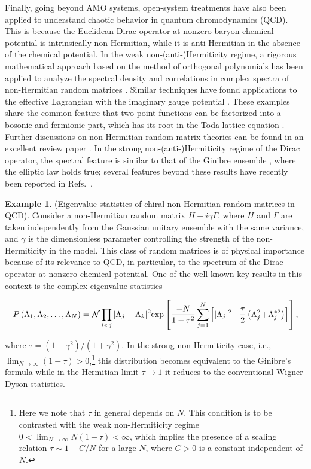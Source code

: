 \documentclass{tADP2e}
\theoremstyle{plain}
\newcommand{\eqn}[1]{
\begin{eqnarray}
	#1
\end{eqnarray}
}
\theoremstyle{plain}
\theoremstyle{definition}
\newtheorem{example}{Example}[section]
\newcommand{\exmp}[1]{
\begin{example}
	#1
\end{example}
}
\begin{document}
Finally, going beyond AMO systems, open-system treatments have also been applied to understand chaotic behavior in quantum chromodynamics (QCD). This is because the Euclidean Dirac operator at nonzero baryon chemical potential is intrinsically non-Hermitian, while it is anti-Hermitian in the absence of the chemical potential. In the weak non-(anti-)Hermiticity regime, a rigorous mathematical approach based on the method of orthogonal polynomials has been applied to analyze the spectral density and correlations in complex spectra of non-Hermitian random matrices \cite{RMTbook}. Similar techniques have found applications to the effective Lagrangian with the imaginary gauge potential \cite{EKB97,EKB972}. These examples share the common feature that two-point functions  can be factorized into a bosonic and fermionic part, which has its root in the Toda lattice equation \cite{KS04}. 
Further discussions on non-Hermitian random matrix theories can be found in an excellent review paper \cite{Fyodorov_2003}. In the strong non-(anti-)Hermiticity regime of the Dirac operator, the spectral feature is similar to that of the Ginibre ensemble \cite{JG65}, where the elliptic law holds true; several features beyond these results have recently been reported in Refs.~\cite{AG18,AG19,LACT19,DS19,CT19,WK20}.
\exmp{(Eigenvalue statistics of chiral non-Hermitian random matrices in QCD).  
Consider a non-Hermitian random matrix $H-i\gamma\Gamma$, where $H$ and $\Gamma$ are taken independently from the Gaussian unitary ensemble with the same variance, and $\gamma$ is the dimensionless parameter controlling the strength of the non-Hermiticity in the model. This class of random matrices is of physical importance because of its relevance to  QCD, in particular, to the spectrum of the Dirac operator at nonzero chemical potential. One of the well-known key results in this context is the complex eigenvalue statistics \cite{FYV97}
\eqn{
P\left(\Lambda_{1},\Lambda_{2},\ldots,\Lambda_{N}\right)={\cal N}\prod_{i<j}|\Lambda_{j}-\Lambda_{k}|^{2}\!\exp\left[\frac{-N}{1-\tau^{2}}\sum_{j=1}^{N}\left[|\Lambda_{j}|^{2}\!-\!\frac{\tau}{2}\left(\Lambda_{j}^{2}\!+\!\Lambda_{j}^{*2}\right)\right]\right],
}
where $\tau=(1-\gamma^2)/(1+\gamma^2)$. In the strong non-Hermiticity case, i.e., $\lim_{N\to\infty}(1-\tau)>0$,\footnote{Here we note that $\tau$ in general depends on $N$. This condition is to be contrasted with the weak non-Hermiticity regime $0<\lim_{N\to\infty}N(1-\tau)<\infty$, which implies the presence of a scaling relation $\tau\sim 1-C/N$ for a large $N$, where $C>0$ is a constant independent of $N$.} this distribution becomes equivalent to the Ginibre's formula \cite{JG65} while in the Hermitian limit $\tau\to 1$ it reduces to the conventional Wigner-Dyson statistics.
}
\end{document}
